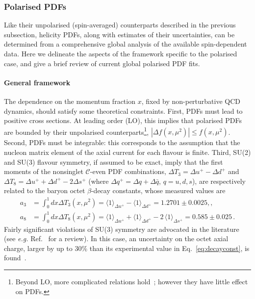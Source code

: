\subsubsection{Polarised PDFs}
\label{sec:polPDFs}

Like their unpolarised (spin-averaged) counterparts described in the previous 
subsection, helicity PDFs, along with estimates of their uncertainties, can be 
determined from a comprehensive global analysis of the available spin-dependent 
data. 
%
Here we delineate the aspects of the framework specific to the polarised
case, and give a brief review of current global polarised PDF fits.

\paragraph{General framework}
%
The dependence on the momentum fraction $x$, fixed by non-perturbative QCD 
dynamics, should satisfy some theoretical constraints.
%
First, PDFs must lead to positive cross sections.
At leading order (LO), this implies that polarised 
PDFs are bounded by their unpolarised counterparts\footnote{Beyond LO, more 
complicated relations hold~\cite{Altarelli:1998gn}; however they have little
effect on PDFs.}, $|\Delta f(x,\mu^2)|\leq f(x,\mu^2)$.
%
Second, PDFs must be integrable: this corresponds to the assumption 
that the nucleon matrix element of the axial current for each flavour is finite.
%
Third, SU(2) and SU(3) flavour symmetry, if assumed to be exact, imply that 
the first moments of the nonsinglet $\mathcal{C}$-even PDF combinations,
$\Delta T_3=\Delta u^+ -\Delta d^+$ and 
$\Delta T_8 = \Delta u^+ +\Delta d^+ -2\Delta s^+$ 
(where $\Delta q^+=\Delta q+\Delta\bar{q}$, $q=u,d,s$), are respectively
related to the baryon octet $\beta$-decay constants, whose 
measured values are~\cite{Olive:2016xmw}
\begin{align}
 a_3
 & =
 \int_0^1 dx \Delta T_3 (x,\mu^2)
 = \langle 1\rangle_{\Delta u^+} - \langle 1\rangle_{\Delta d^+}  = 1.2701 \pm 0.0025
 ,,\\
 a_8
 & =
 \int_0^1 dx \Delta T_8 (x,\mu^2)
 = \langle 1 \rangle_{\Delta u^+} + \langle 1 \rangle_{\Delta d^+} -2\,\langle 1 \rangle_{\Delta s^+} 
 =0.585  \pm 0.025
 \,.
\label{eq:decayconst}
\end{align}
%
Fairly significant violations of SU(3) symmetry are advocated
in the literature (see {\it e.g.} Ref.~\cite{Cabibbo:2003cu} for a review). 
%
In this case, an uncertainty on the octet axial charge, larger by up to $30\%$ 
than its experimental value in Eq.~\eqref{eq:decayconst}, 
is found~\cite{FloresMendieta:1998ii}. 

